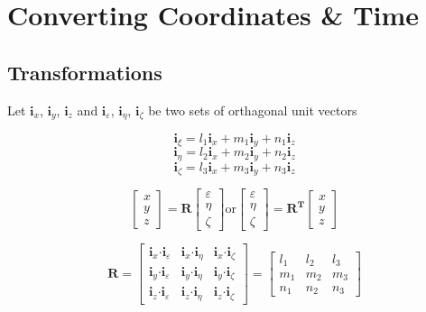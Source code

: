 %
\chapter{Converting Coordinates \& Time}
\section{Transformations}

Let $\mathbf{i}_{x}$, $\mathbf{i}_{y}$, $\mathbf{i}_{z}$ and $\mathbf{i}_{\varepsilon}$, $\mathbf{i}_{\eta}$, $\mathbf{i}_{\zeta}$ be two sets of orthagonal unit vectors

\[\mathbf{i}_{\xi}=l_{1}\mathbf{i}_{x}+m_{1}\mathbf{i}_{y}+n_{1}\mathbf{i}_{z}\]
\[\mathbf{i}_{\eta}=l_{2}\mathbf{i}_{x}+m_{2}\mathbf{i}_{y}+n_{2}\mathbf{i}_{z}\]
\[\mathbf{i}_{\zeta}=l_{3}\mathbf{i}_{x}+m_{3}\mathbf{i}_{y}+n_{3}\mathbf{i}_{z}\]

\[ \left[ \begin{array}{c} x \\ y \\ z  \end{array} \right] = \mathbf{R}\left[ \begin{array}{c} \varepsilon \\ \eta \\ \zeta  \end{array} \right] \mbox{or}
\left[ \begin{array}{c} \varepsilon \\ \eta \\ \zeta  \end{array} \right] = \mathbf{R^{T}}\left[ \begin{array}{c} x \\ y \\ z  \end{array} \right] \]

\[\mathbf{R}=\left[ \begin{array}{ccc}
\mathbf{i}_{x}\mathbf{\cdot}\mathbf{i}_{\varepsilon} & \mathbf{i}_{x}\mathbf{\cdot}\mathbf{i}_{\eta} & \mathbf{i}_{x}\mathbf{\cdot}\mathbf{i}_{\zeta} \\
\mathbf{i}_{y}\mathbf{\cdot}\mathbf{i}_{\varepsilon} & \mathbf{i}_{y}\mathbf{\cdot}\mathbf{i}_{\eta} & \mathbf{i}_{y}\mathbf{\cdot}\mathbf{i}_{\zeta} \\
\mathbf{i}_{z}\mathbf{\cdot}\mathbf{i}_{\varepsilon} & \mathbf{i}_{z}\mathbf{\cdot}\mathbf{i}_{\eta} & \mathbf{i}_{z}\mathbf{\cdot}\mathbf{i}_{\zeta}
\end{array} \right] = \left[ \begin{array}{ccc}
l_{1} & l_{2} & l_{3} \\
m_{1} & m_{2} & m_{3} \\
n_{1} & n_{2} & n_{3}
\end{array} \right] \]

